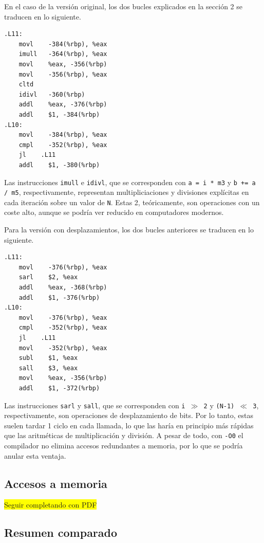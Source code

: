 \documentclass[11pt,a4paper,twoside]{article}
\theoremstyle{definition}
\begin{document}
	En el caso de la versión original, los dos bucles explicados en la sección 2 se traducen en lo siguiente.
	
	\begin{verbatim}
.L11:
	movl	-384(%rbp), %eax
	imull	-364(%rbp), %eax
	movl	%eax, -356(%rbp)
	movl	-356(%rbp), %eax
	cltd
	idivl	-360(%rbp)
	addl	%eax, -376(%rbp)
	addl	$1, -384(%rbp)
.L10:
	movl	-384(%rbp), %eax
	cmpl	-352(%rbp), %eax
	jl	  .L11
	addl	$1, -380(%rbp)
	\end{verbatim}

	Las instrucciones \texttt{imull} e \texttt{idivl}, que se corresponden con \texttt{a = i * m3} y \texttt{b += a / m5}, respectivamente, representan multipliciaciones y divisiones explícitas en cada iteración sobre un valor de \texttt{N}. Estas 2, teóricamente, son operaciones con un coste alto, aunque se podría ver reducido en computadores modernos.
	
	Para la versión con desplazamientos, los dos bucles anteriores se traducen en lo siguiente.
	
	\begin{verbatim}
.L11:
	movl	-376(%rbp), %eax
	sarl	$2, %eax
	addl	%eax, -368(%rbp)
	addl	$1, -376(%rbp)
.L10:
	movl	-376(%rbp), %eax
	cmpl	-352(%rbp), %eax
	jl	  .L11
	movl	-352(%rbp), %eax
	subl	$1, %eax
	sall	$3, %eax
	movl	%eax, -356(%rbp)
	addl	$1, -372(%rbp)
	\end{verbatim}

	Las instrucciones \texttt{sarl} y \texttt{sall}, que se corresponden con \texttt{i $\gg$ 2} y \texttt{(N-1) $\ll$ 3}, respectivamente, son operaciones de desplazamiento de bits. Por lo tanto, estas suelen tardar 1 ciclo en cada llamada, lo que las haría en principio más rápidas que las aritméticas de multiplicación y división. A pesar de todo, con \texttt{-O0} el compilador no elimina accesos redundantes a memoria, por lo que se podría anular esta ventaja.
	
	\subsection{Accesos a memoria}
	
	\colorbox{yellow}{Seguir completando con PDF}
	
	\subsection{Resumen comparado}
	
\end{document}
